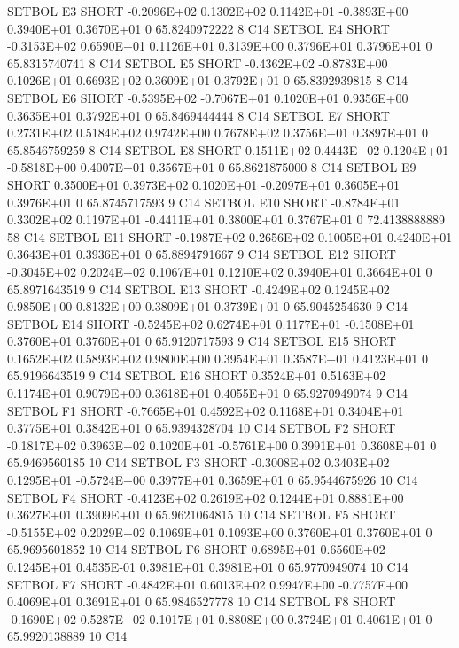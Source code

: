 \documentclass[twoside,11pt,nolof]{starlink}
\begin{document}
\begin{landscape}
\begin{small}
\begin{terminalv}
{{{{{ SETBOL E3  SHORT    -0.2096E+02  0.1302E+02  0.1142E+01 -0.3893E+00  0.3940E+01  0.3670E+01  0  65.8240972222   8 C14
 SETBOL E4  SHORT    -0.3153E+02  0.6590E+01  0.1126E+01  0.3139E+00  0.3796E+01  0.3796E+01  0  65.8315740741   8 C14
 SETBOL E5  SHORT    -0.4362E+02 -0.8783E+00  0.1026E+01  0.6693E+02  0.3609E+01  0.3792E+01  0  65.8392939815   8 C14
 SETBOL E6  SHORT    -0.5395E+02 -0.7067E+01  0.1020E+01  0.9356E+00  0.3635E+01  0.3792E+01  0  65.8469444444   8 C14
 SETBOL E7  SHORT     0.2731E+02  0.5184E+02  0.9742E+00  0.7678E+02  0.3756E+01  0.3897E+01  0  65.8546759259   8 C14
 SETBOL E8  SHORT     0.1511E+02  0.4443E+02  0.1204E+01 -0.5818E+00  0.4007E+01  0.3567E+01  0  65.8621875000   8 C14
 SETBOL E9  SHORT     0.3500E+01  0.3973E+02  0.1020E+01 -0.2097E+01  0.3605E+01  0.3976E+01  0  65.8745717593   9 C14
 SETBOL E10 SHORT    -0.8784E+01  0.3302E+02  0.1197E+01 -0.4411E+01  0.3800E+01  0.3767E+01  0  72.4138888889  58 C14
 SETBOL E11 SHORT    -0.1987E+02  0.2656E+02  0.1005E+01  0.4240E+01  0.3643E+01  0.3936E+01  0  65.8894791667   9 C14
 SETBOL E12 SHORT    -0.3045E+02  0.2024E+02  0.1067E+01  0.1210E+02  0.3940E+01  0.3664E+01  0  65.8971643519   9 C14
 SETBOL E13 SHORT    -0.4249E+02  0.1245E+02  0.9850E+00  0.8132E+00  0.3809E+01  0.3739E+01  0  65.9045254630   9 C14
 SETBOL E14 SHORT    -0.5245E+02  0.6274E+01  0.1177E+01 -0.1508E+01  0.3760E+01  0.3760E+01  0  65.9120717593   9 C14
 SETBOL E15 SHORT     0.1652E+02  0.5893E+02  0.9800E+00  0.3954E+01  0.3587E+01  0.4123E+01  0  65.9196643519   9 C14
 SETBOL E16 SHORT     0.3524E+01  0.5163E+02  0.1174E+01  0.9079E+00  0.3618E+01  0.4055E+01  0  65.9270949074   9 C14
 SETBOL F1  SHORT    -0.7665E+01  0.4592E+02  0.1168E+01  0.3404E+01  0.3775E+01  0.3842E+01  0  65.9394328704  10 C14
 SETBOL F2  SHORT    -0.1817E+02  0.3963E+02  0.1020E+01 -0.5761E+00  0.3991E+01  0.3608E+01  0  65.9469560185  10 C14
 SETBOL F3  SHORT    -0.3008E+02  0.3403E+02  0.1295E+01 -0.5724E+00  0.3977E+01  0.3659E+01  0  65.9544675926  10 C14
 SETBOL F4  SHORT    -0.4123E+02  0.2619E+02  0.1244E+01  0.8881E+00  0.3627E+01  0.3909E+01  0  65.9621064815  10 C14
 SETBOL F5  SHORT    -0.5155E+02  0.2029E+02  0.1069E+01  0.1093E+00  0.3760E+01  0.3760E+01  0  65.9695601852  10 C14
 SETBOL F6  SHORT     0.6895E+01  0.6560E+02  0.1245E+01  0.4535E-01  0.3981E+01  0.3981E+01  0  65.9770949074  10 C14
 SETBOL F7  SHORT    -0.4842E+01  0.6013E+02  0.9947E+00 -0.7757E+00  0.4069E+01  0.3691E+01  0  65.9846527778  10 C14
 SETBOL F8  SHORT    -0.1690E+02  0.5287E+02  0.1017E+01  0.8808E+00  0.3724E+01  0.4061E+01  0  65.9920138889  10 C14
}}}}}
\end{terminalv}
\end{small}
\end{landscape}
\end{document}
